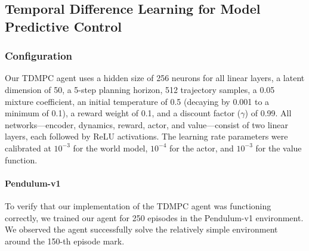 \subsection{Temporal Difference Learning for Model Predictive Control}

\subsubsection{Configuration}
Our TDMPC agent uses a hidden size of 256 neurons for all linear layers, a latent dimension of 50, a 5-step planning horizon, 512 trajectory samples, a 0.05 mixture coefficient, an initial temperature of 0.5 (decaying by 0.001 to a minimum of 0.1), a reward weight of 0.1, and a discount factor ($\gamma$) of 0.99. All networks—encoder, dynamics, reward, actor, and value—consist of two linear layers, each followed by ReLU activations. The learning rate parameters were calibrated at $10^{-3}$ for the world model, $10^{-4}$ for the actor, and $10^{-3}$ for the value function.

\paragraph{Pendulum-v1}
To verify that our implementation of the TDMPC agent was functioning correctly, we trained our agent for 250 episodes in the Pendulum-v1 environment. We observed the agent successfully solve the relatively simple environment around the 150-th episode mark.

